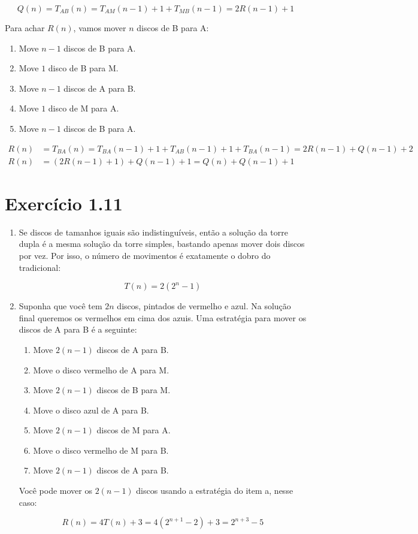 \documentclass[10pt]{book}
\begin{document}
\[ Q(n)=T_{AB}(n)=T_{AM}(n-1)+1+T_{MB}(n-1)=2R(n-1)+1  \]

 Para achar $R(n)$, vamos mover $n$ discos de B para A: 

\begin{enumerate}
  \item Move $n-1$ discos de B para A. 
  \item Move $1$ disco de B para M. 
  \item Move $n-1$ discos de A para B. 
  \item Move $1$ disco de M para A. 
  \item Move $n-1$ discos de B para A. 
\end{enumerate}

\begin{align*}
 R(n)&=T_{BA}(n)=T_{BA}(n-1)+1+T_{AB}(n-1)+1+T_{BA}(n-1)=2R(n-1)+Q(n-1)+2  \\
 R(n)&=(2R(n-1)+1)+Q(n-1)+1=Q(n)+Q(n-1)+1 
\end{align*}

\section{  Exercício 1.11 }

\begin{enumerate}
 \item Se discos de tamanhos iguais são indistinguíveis, então a solução da torre dupla é a mesma solução da torre simples, bastando apenas mover dois discos por vez. Por isso, o número de movimentos é exatamente o dobro do tradicional: 

\[ T(n)=2(2^n-1) \]

 \item Suponha que você tem $2n$ discos, pintados de vermelho e azul. Na solução final queremos os vermelhos em cima dos azuis. Uma estratégia para mover os discos de A para B é a seguinte: 

  \begin{enumerate}
    \item Move $2(n-1)$ discos de A para B.  
    \item Move o disco vermelho de A para M. 
    \item Move $2(n-1)$ discos de B para M. 
    \item Move o disco azul de A para B. 
    \item Move $2(n-1)$ discos de M para A. 
    \item Move o disco vermelho de M para B. 
    \item Move $2(n-1)$ discos de A para B. 
  \end{enumerate}

Você pode mover os $2(n-1)$ discos usando a estratégia do item a, nesse caso: 

\[ R(n)=4T(n)+3=4(2^{n+1}-2)+3=2^{n+3}-5 \]

\end{enumerate}
\end{document}
